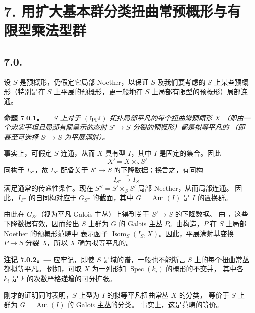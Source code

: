 \section*{7. 用扩大基本群分类扭曲常预概形与有限型乘法型群}

\setcounter{footnote}{57}

\subsection*{7.0.}

设 \(S\) 是预概形，仍假定它局部 Noether，以保证 \(S\) 及我们要考虑的
\(S\) 上某些预概形（特别是在 \(S\) 上平展的预概形，更一般地在 \(S\) 上局部有限型的预概形）局部连通。

\par\medskip\noindent{}\textbf{命题 7.0.1。---}\enspace
\emph{\(S\) 上对于 \((\mathrm{fppf})\) 拓扑局部平凡的每个扭曲常预概形 \(X\)
（即由一个忠实平坦且局部有限呈示的态射 \(S'\to S\) 分裂的预概形）都是拟等平凡的
（即甚至可选择 \(S'\to S\) 为平展满射）。}

事实上，可假定 \(S\) 连通，从而 \(X\) 具有型 \(I\)，其中 \(I\) 是固定的集合。因此
\[
  X'=X\times_S S'
\]
同构于 \(I_{S'}\)，故 \(I_{S'}\) 配备关于 \(S'\to S\) 的下降数据；换言之，有同构
\[
  I_{S''}\xrightarrow{\sim}I_{S''}
\]
满足通常的传递性条件。现在 \(S''=S'\times_S S'\) 局部 Noether，从而局部连通。
因此，\(I_{S''}\) 的自同构对应于 \(G_{S''}\) 的截面，其中
\(G=\operatorname{Aut}(I)\) 是 \(I\) 的置换群。

由此在 \(G_{S'}\)（视为平凡 Galois 主丛）上得到关于 \(S'\to S\) 的下降数据。
由 ，这些下降数据有效，因而给出 \(S\) 上群为
\(G\) 的 Galois 主丛 \(P\)。由构造，\(P\) 在 \(S\) 上局部 Noether 的预概形范畴中
表示函子 \(\operatorname{Isom}_S(I_S,X)\)。因此，平展满射基变换 \(P\to S\)
分裂 \(X\)，所以 \(X\) 确为拟等平凡的。

\par\medskip\noindent{}\textbf{注记 7.0.2。---}\enspace
应牢记，即使 \(S\) 是域的谱，一般也不能断言 \(S\) 上的每个扭曲常丛都拟等平凡。
例如，可取 \(X\) 为一列形如 \(\operatorname{Spec}(k_i)\) 的概形的不交并，
其中各 \(k_i\) 是 \(k\) 的次数严格递增的可分扩张。

刚才的证明同时表明，\(S\) 上型为 \(I\) 的拟等平凡扭曲常丛 \(X\) 的分类，
等价于 \(S\) 上群为 \(G=\operatorname{Aut}(I)\) 的 Galois 主丛的分类。
事实上，这是范畴的等价。

